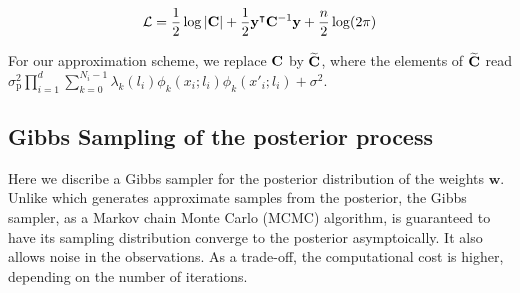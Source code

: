 \documentclass{article}
\begin{document}
\begin{equation}\label{}
	\mathcal{L} = \frac{1}{2} \log |{\bf C}| + \frac{1}{2} {\bf y}^\intercal {\bf C}^{-1} {\bf y} +\frac{n}{2} \log(2 \pi) 
\end{equation}

For our approximation scheme, we replace ${\bf C}$ by $\widetilde{\bf C}$, where the elements of $\widetilde{\bf C}$ read $\sigma^2_\text{p} \prod_{i=1}^{d} \sum_{k=0}^{N_i-1} \lambda_k (l_i) \phi_k(x_i;l_i) \phi_k(x'_i;l_i) + \sigma^2$.

%


\subsection{Gibbs Sampling of the posterior process}
\label{sec:Gibbs}

Here we discribe a Gibbs sampler for the posterior distribution of the weights $\mathbf{w}$.
Unlike  which generates approximate samples from the posterior,
the Gibbs sampler, as a Markov chain Monte Carlo (MCMC) algorithm,
is guaranteed to have its sampling distribution converge to the posterior asymptoically.
It also allows noise in the observations.
As a trade-off, the computational cost is higher, depending on the number of iterations.
\end{document}
